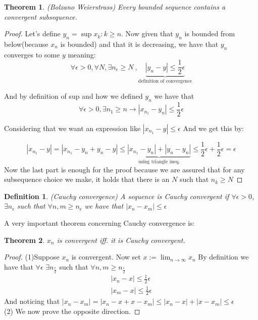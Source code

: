 \documentclass{article}
\newtheorem{theorem}{Theorem}[section]
\newtheorem{definition}{Definition}
\numberwithin{equation}{subsection}
\begin{document}
\begin{theorem}(Bolzano Weierstrass)
Every bounded sequence contains a convergent subsequence. 
\end{theorem}

\begin{proof}
Let's define $y_{n} = \sup{x_{k}:k\geq n}$. Now given that $y_{n}$ is bounded from below(because $x_{n}$ is bounded) and that it is decreasing, we have that $y_{n}$ converges to some $y$ meaning:
$$ \forall \epsilon > 0, \forall N, \exists n_{\epsilon} \geq N \ , \underbrace{|y_{n} - y|\leq \frac{1}{2}\epsilon}_{\text{definition of convergence}}$$

And by definition of sup and how we defined $y_{n}$ we have that 
$$ \forall \epsilon > 0, \exists n_{1} \geq n \rightarrow |x_{n_{1}} - y_{n}| \leq \frac{1}{2}\epsilon$$

Considering that we want an expression like $|x_{n_{1}} - y|\leq\epsilon$ And we get this by:

$$ |x_{n_{1}} - y| = |x_{n_{1}} - y_{n} + y_{n} - y| \leq \underbrace{|x_{n_{1}} - y_{n}| + |y_{n} - y_{n}|}_{\text{using triangle ineq.}} \leq \frac{1}{2}\epsilon + \frac{1}{2}\epsilon = \epsilon $$
Now the last part is enough for the proof because we are assured that for any subsequence choice we make, it holds that there is an $N$ such that $n_{k} \geq N$
\end{proof}


\begin{definition} (Cauchy convergence)
A sequence is Cauchy convergent if $\forall \epsilon > 0$, $\exists n_{\epsilon}$ such that $\forall n,m \geq n_{\epsilon}$ we have that $|x_{n} - x_{m}| \leq \epsilon$
\end{definition}

A very important theorem concerning Cauchy convergence is:

\begin{theorem}
$x_{n}$ is convergent iff. it is Cauchy convergent. 
\end{theorem}

\begin{proof} (1)Suppose $x_{n}$ is convergent. Now set $x := \lim_{n \to \infty}{x_{n}}$ By definition we have that $\forall \epsilon$ $\exists n_{\frac{\epsilon}{2}}$ such that $\forall n,m \geq n_{\frac{\epsilon}{2}}$ 
\begin{align*}
    |x_{n} - x| \leq \frac{1}{2}\epsilon\\
    |x_{m} - x| \leq \frac{1}{2}\epsilon
\end{align*}
And noticing that $|x_{n} - x_{m}| = |x_{n} - x + x - x_{m}| \leq |x_{n} - x| + |x - x_{m}| \leq \epsilon$
\\
(2) We now prove the opposite direction. 
\end{proof}
\end{document}
